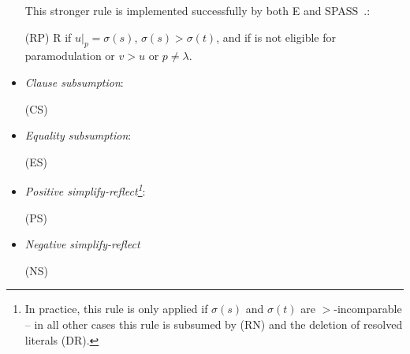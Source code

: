 \documentclass{report}
\begin{document}
\begin{definition}
\begin{itemize}
{     \medskip \noindent This stronger rule is implemented successfully
     by both E and
     SPASS~\cite{Weidenbach:personal-99}.}:

   \bigskip (RP) 
   { \phantom{ae}  \vee
     R} {if $u|_p = \sigma(s)$, $\sigma(s)>\sigma(t)$, and if
      is not eligible for paramodulation or $v > u$ or $p
     \not= \lambda$.}

 \item \emph{Clause subsumption}:

   \bigskip (CS) 

 \item \emph{Equality subsumption}:

   \bigskip (ES) 

 \item \emph{Positive simplify-reflect\footnote{In
       practice, this rule is only applied if $\sigma(s)$ and
       $\sigma(t)$ are $>$-incomparable -- in all other cases this
       rule is subsumed by (RN) and the deletion of resolved literals
       (DR).}}:

   \bigskip (PS) 


 \item \emph{Negative simplify-reflect}

   \bigskip (NS) 

%



\end{itemize}
\end{definition}
\end{document}
